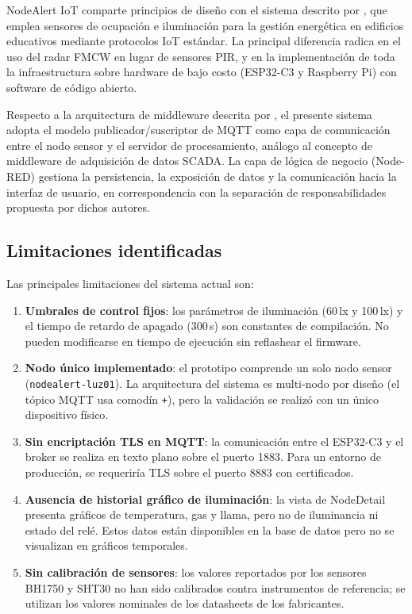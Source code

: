 NodeAlert IoT comparte principios de diseño con el sistema descrito por
\textcite{Jia2019}, que emplea sensores de ocupación e iluminación para la gestión
energética en edificios educativos mediante protocolos IoT estándar. La principal
diferencia radica en el uso del radar FMCW en lugar de sensores PIR, y en la
implementación de toda la infraestructura sobre hardware de bajo costo (ESP32-C3
y Raspberry Pi) con software de código abierto.

Respecto a la arquitectura de middleware descrita por \textcite{Cardiel2012}, el
presente sistema adopta el modelo publicador/suscriptor de MQTT como capa de
comunicación entre el nodo sensor y el servidor de procesamiento, análogo al
concepto de middleware de adquisición de datos SCADA. La capa de lógica de negocio
(Node-RED) gestiona la persistencia, la exposición de datos y la comunicación hacia
la interfaz de usuario, en correspondencia con la separación de responsabilidades
propuesta por dichos autores.

\subsection{Limitaciones identificadas}

Las principales limitaciones del sistema actual son:

\begin{enumerate}
  \item \textbf{Umbrales de control fijos}: los parámetros de iluminación
        (60\,lx y 100\,lx) y el tiempo de retardo de apagado (300\,s) son
        constantes de compilación. No pueden modificarse en tiempo de ejecución
        sin reflashear el firmware.
  \item \textbf{Nodo único implementado}: el prototipo comprende un solo nodo
        sensor (\texttt{nodealert-luz01}). La arquitectura del sistema es
        multi-nodo por diseño (el tópico MQTT usa comodín \texttt{+}), pero la
        validación se realizó con un único dispositivo físico.
  \item \textbf{Sin encriptación TLS en MQTT}: la comunicación entre el ESP32-C3
        y el broker se realiza en texto plano sobre el puerto 1883. Para un entorno
        de producción, se requeriría TLS sobre el puerto 8883 con certificados.
  \item \textbf{Ausencia de historial gráfico de iluminación}: la vista de
        NodeDetail presenta gráficos de temperatura, gas y llama, pero no de
        iluminancia ni estado del relé. Estos datos están disponibles en la base
        de datos pero no se visualizan en gráficos temporales.
  \item \textbf{Sin calibración de sensores}: los valores reportados por los
        sensores BH1750 y SHT30 no han sido calibrados contra instrumentos de
        referencia; se utilizan los valores nominales de los datasheets de los
        fabricantes.
\end{enumerate}

